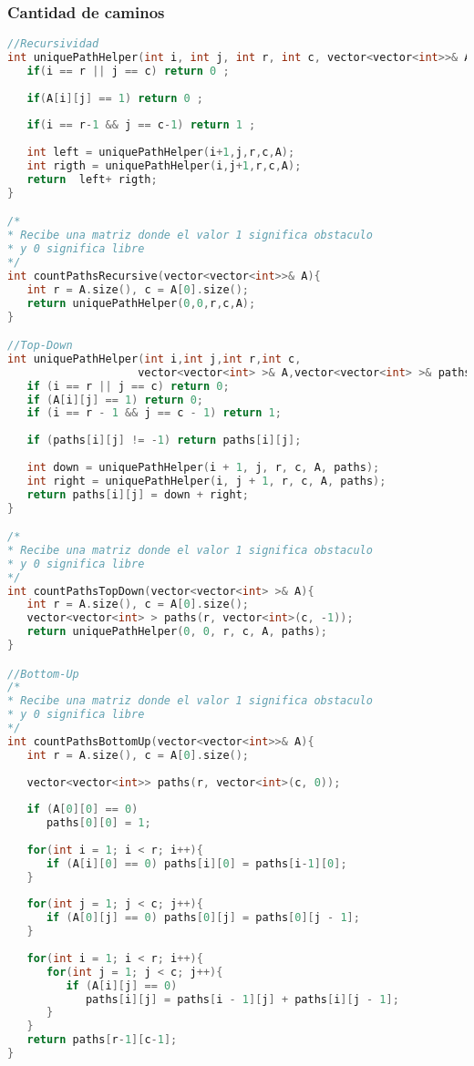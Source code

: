 \subsubsection{Cantidad de caminos}
\begin{lstlisting}[language=C++]
//Recursividad
int uniquePathHelper(int i, int j, int r, int c, vector<vector<int>>& A){
   if(i == r || j == c) return 0 ;
	
   if(A[i][j] == 1) return 0 ;
	
   if(i == r-1 && j == c-1) return 1 ;
	
   int left = uniquePathHelper(i+1,j,r,c,A);
   int rigth = uniquePathHelper(i,j+1,r,c,A); 	
   return  left+ rigth;
}

/*
* Recibe una matriz donde el valor 1 significa obstaculo
* y 0 significa libre
*/
int countPathsRecursive(vector<vector<int>>& A){
   int r = A.size(), c = A[0].size();
   return uniquePathHelper(0,0,r,c,A);
}

//Top-Down
int uniquePathHelper(int i,int j,int r,int c,
					vector<vector<int> >& A,vector<vector<int> >& paths){
   if (i == r || j == c) return 0;
   if (A[i][j] == 1) return 0;
   if (i == r - 1 && j == c - 1) return 1;
	
   if (paths[i][j] != -1) return paths[i][j];
   
   int down = uniquePathHelper(i + 1, j, r, c, A, paths);
   int right = uniquePathHelper(i, j + 1, r, c, A, paths); 	
   return paths[i][j] = down + right;
}

/*
* Recibe una matriz donde el valor 1 significa obstaculo
* y 0 significa libre
*/
int countPathsTopDown(vector<vector<int> >& A){
   int r = A.size(), c = A[0].size();
   vector<vector<int> > paths(r, vector<int>(c, -1));
   return uniquePathHelper(0, 0, r, c, A, paths);
}

//Bottom-Up
/*
* Recibe una matriz donde el valor 1 significa obstaculo
* y 0 significa libre
*/
int countPathsBottomUp(vector<vector<int>>& A){
   int r = A.size(), c = A[0].size();
	
   vector<vector<int>> paths(r, vector<int>(c, 0));
   
   if (A[0][0] == 0)
      paths[0][0] = 1;
	
   for(int i = 1; i < r; i++){
      if (A[i][0] == 0) paths[i][0] = paths[i-1][0];
   }
	
   for(int j = 1; j < c; j++){
      if (A[0][j] == 0) paths[0][j] = paths[0][j - 1];
   }  
	
   for(int i = 1; i < r; i++){
      for(int j = 1; j < c; j++){
         if (A[i][j] == 0)
            paths[i][j] = paths[i - 1][j] + paths[i][j - 1];
      } 
   }
   return paths[r-1][c-1];
}


\end{lstlisting}
